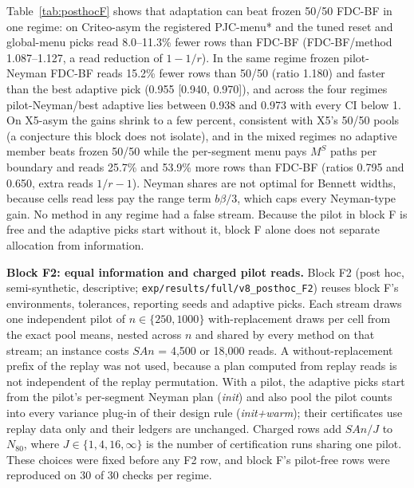 \documentclass[sigconf,anonymous,review]{acmart}
\begin{document}
Table~\ref{tab:posthocF} shows that adaptation can beat frozen 50/50 FDC-BF in one regime: on Criteo-asym the registered PJC-menu* and the tuned reset and global-menu picks read 8.0--11.3\% fewer rows than FDC-BF (FDC-BF/method 1.087--1.127, a read reduction of $1 - 1/r$). In the same regime frozen pilot-Neyman FDC-BF reads 15.2\% fewer rows than 50/50 (ratio 1.180) and faster than the best adaptive pick (0.955 [0.940, 0.970]), and across the four regimes pilot-Neyman/best adaptive lies between 0.938 and 0.973 with every CI below 1. On X5-asym the gains shrink to a few percent, consistent with X5's 50/50 pools (a conjecture this block does not isolate), and in the mixed regimes no adaptive member beats frozen 50/50 while the per-segment menu pays $M^S$ paths per boundary and reads 25.7\% and 53.9\% more rows than FDC-BF (ratios 0.795 and 0.650, extra reads $1/r - 1$). Neyman shares are not optimal for Bennett widths, because cells read less pay the range term $b\beta/3$, which caps every Neyman-type gain. No method in any regime had a false stream. Because the pilot in block F is free and the adaptive picks start without it, block F alone does not separate allocation from information.



\textbf{Block F2: equal information and charged pilot reads.} Block F2 (post hoc, semi-synthetic, descriptive; \texttt{exp/results/full/v8\_posthoc\_F2}) reuses block F's environments, tolerances, reporting seeds and adaptive picks. Each stream draws one independent pilot of $n \in \{250, 1000\}$ with-replacement draws per cell from the exact pool means, nested across $n$ and shared by every method on that stream; an instance costs $SAn$ = 4,500 or 18,000 reads. A without-replacement prefix of the replay was not used, because a plan computed from replay reads is not independent of the replay permutation. With a pilot, the adaptive picks start from the pilot's per-segment Neyman plan (\emph{init}) and also pool the pilot counts into every variance plug-in of their design rule (\emph{init+warm}); their certificates use replay data only and their ledgers are unchanged. Charged rows add $SAn/J$ to $N_{80}$, where $J \in \{1, 4, 16, \infty\}$ is the number of certification runs sharing one pilot. These choices were fixed before any F2 row, and block F's pilot-free rows were reproduced on 30 of 30 checks per regime.
\end{document}
